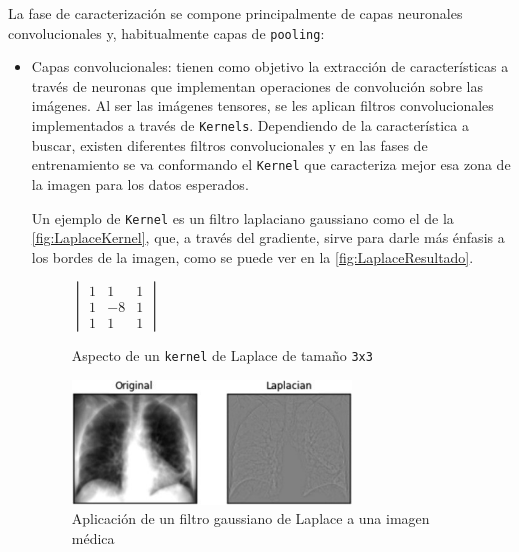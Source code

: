 \clearpage

La fase de caracterización se compone principalmente de capas neuronales convolucionales y, habitualmente capas de \texttt{pooling}:

\begin{itemize}
    \item Capas convolucionales: tienen como objetivo la extracción de características a través de neuronas que implementan operaciones de convolución sobre las imágenes. 
    Al ser las imágenes tensores, se les aplican filtros convolucionales implementados a través de \texttt{Kernels}. 
    Dependiendo de la característica a buscar, existen diferentes filtros convolucionales y en las fases de entrenamiento se va conformando el \texttt{Kernel} que caracteriza mejor esa zona de la imagen para los datos esperados.

    Un ejemplo de \texttt{Kernel} es un filtro laplaciano gaussiano como el de la \autoref{fig:LaplaceKernel}, que, a través del gradiente, sirve para darle más énfasis a los bordes de la imagen, como se puede ver 
    en la \autoref{fig:LaplaceResultado}.
    \begin{figure}[H]
        \centering
        \(
        \begin{vmatrix}
            1 & 1 & 1 \\
            1 & -8 & 1 \\
            1 & 1 & 1
        \end{vmatrix}
        \)
        \caption{Aspecto de un \texttt{kernel} de Laplace de tamaño \texttt{3x3}}
        \label{fig:LaplaceKernel}
    \end{figure}
    \begin{figure}[H]
        \centering
        \includegraphics[width=0.7\textwidth]{images/4/KernelsTipicos.jpg}
        \caption{Aplicación de un filtro gaussiano de Laplace a una imagen médica\cite{LaplacianFilterOverview}}
        \label{fig:LaplaceResultado}
    \end{figure}


\end{itemize}

